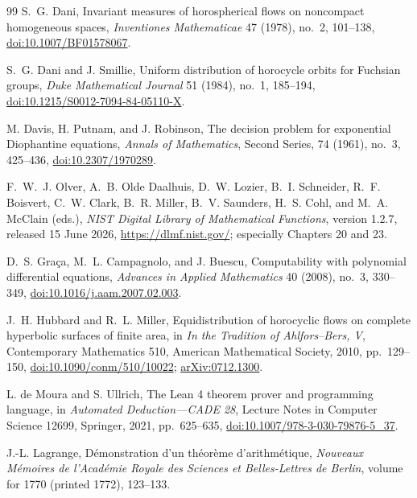 \documentclass[11pt]{article}
\begin{document}
\begin{thebibliography}{99}
S.~G. Dani,
\newblock Invariant measures of horospherical flows on noncompact
homogeneous spaces,
\newblock \emph{Inventiones Mathematicae} 47 (1978), no.~2, 101--138,
\newblock \href{https://doi.org/10.1007/BF01578067}
{doi:10.1007/BF01578067}.

S.~G. Dani and J. Smillie,
\newblock Uniform distribution of horocycle orbits for Fuchsian groups,
\newblock \emph{Duke Mathematical Journal} 51 (1984), no.~1, 185--194,
\newblock \href{https://doi.org/10.1215/S0012-7094-84-05110-X}
{doi:10.1215/S0012-7094-84-05110-X}.

M. Davis, H. Putnam, and J. Robinson,
\newblock The decision problem for exponential Diophantine equations,
\newblock \emph{Annals of Mathematics}, Second Series, 74 (1961), no.~3,
425--436,
\newblock \href{https://doi.org/10.2307/1970289}
{doi:10.2307/1970289}.

F.~W.~J. Olver, A.~B. Olde Daalhuis, D.~W. Lozier, B.~I. Schneider,
R.~F. Boisvert, C.~W. Clark, B.~R. Miller, B.~V. Saunders, H.~S. Cohl,
and M.~A. McClain (eds.),
\newblock \emph{NIST Digital Library of Mathematical Functions},
\newblock version 1.2.7, released 15 June 2026,
\url{https://dlmf.nist.gov/}; especially Chapters 20 and 23.

D.~S. Gra\c ca, M.~L. Campagnolo, and J. Buescu,
\newblock Computability with polynomial differential equations,
\newblock \emph{Advances in Applied Mathematics} 40 (2008), no.~3,
330--349,
\newblock \href{https://doi.org/10.1016/j.aam.2007.02.003}
{doi:10.1016/j.aam.2007.02.003}.

J.~H. Hubbard and R.~L. Miller,
\newblock Equidistribution of horocyclic flows on complete hyperbolic
surfaces of finite area,
\newblock in \emph{In the Tradition of Ahlfors--Bers, V},
Contemporary Mathematics 510, American Mathematical Society, 2010,
pp.~129--150,
\newblock \href{https://doi.org/10.1090/conm/510/10022}
{doi:10.1090/conm/510/10022};
\href{https://arxiv.org/abs/0712.1300}{arXiv:0712.1300}.

L. de Moura and S. Ullrich,
\newblock The Lean 4 theorem prover and programming language,
\newblock in \emph{Automated Deduction---CADE 28}, Lecture Notes in
Computer Science 12699, Springer, 2021, pp.~625--635,
\newblock \href{https://doi.org/10.1007/978-3-030-79876-5_37}
{doi:10.1007/978-3-030-79876-5\_37}.

J.-L. Lagrange,
\newblock D\'emonstration d'un th\'eor\`eme d'arithm\'etique,
\newblock \emph{Nouveaux M\'emoires de l'Acad\'emie Royale des Sciences et
Belles-Lettres de Berlin}, volume for 1770 (printed 1772), 123--133.


\end{thebibliography}
\end{document}
